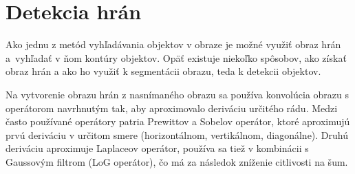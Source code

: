 \section{Detekcia hrán}

    Ako jednu z metód vyhľadávania objektov v obraze je možné využiť obraz hrán a~vyhľadať v ňom kontúry objektov. Opäť existuje niekoľko spôsobov, ako získať obraz hrán a ako ho využiť k segmentácii obrazu, teda k detekcii objektov.

    Na vytvorenie obrazu hrán z nasnímaného obrazu sa používa konvolúcia obrazu s operátorom navrhnutým tak, aby aproximovalo deriváciu určitého rádu. Medzi často používané operátory patria Prewittov a Sobelov operátor, ktoré aproximujú prvú deriváciu v určitom smere (horizontálnom, vertikálnom, diagonálne). Druhú deriváciu aproximuje Laplaceov operátor, používa sa tiež v kombinácii s Gaussovým filtrom (LoG operátor), čo má za následok zníženie citlivosti na šum. \cite{Samina2023}

